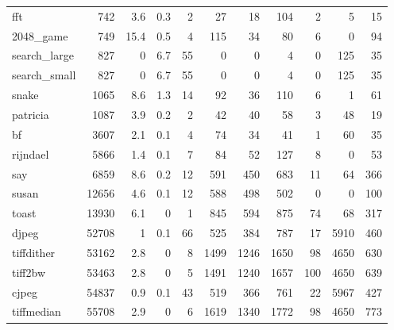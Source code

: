 \begin{tabular}{lrrrrrrrrrr}
 fft             &            742 &      3.6 &    0.3 &    2 &     27 &         18 &          104 &     2 &     5 &    15 \\
 2048\_game       &            749 &     15.4 &    0.5 &    4 &    115 &         34 &           80 &     6 &     0 &    94 \\
 search\_large    &            827 &      0   &    6.7 &   55 &      0 &          0 &            4 &     0 &   125 &    35 \\
 search\_small    &            827 &      0   &    6.7 &   55 &      0 &          0 &            4 &     0 &   125 &    35 \\
 snake           &           1065 &      8.6 &    1.3 &   14 &     92 &         36 &          110 &     6 &     1 &    61 \\
 patricia        &           1087 &      3.9 &    0.2 &    2 &     42 &         40 &           58 &     3 &    48 &    19 \\
 bf              &           3607 &      2.1 &    0.1 &    4 &     74 &         34 &           41 &     1 &    60 &    35 \\
 rijndael        &           5866 &      1.4 &    0.1 &    7 &     84 &         52 &          127 &     8 &     0 &    53 \\
 say             &           6859 &      8.6 &    0.2 &   12 &    591 &        450 &          683 &    11 &    64 &   366 \\
 susan           &          12656 &      4.6 &    0.1 &   12 &    588 &        498 &          502 &     0 &     0 &   100 \\
 toast           &          13930 &      6.1 &    0   &    1 &    845 &        594 &          875 &    74 &    68 &   317 \\
 djpeg           &          52708 &      1   &    0.1 &   66 &    525 &        384 &          787 &    17 &  5910 &   460 \\
 tiffdither      &          53162 &      2.8 &    0   &    8 &   1499 &       1246 &         1650 &    98 &  4650 &   630 \\
 tiff2bw         &          53463 &      2.8 &    0   &    5 &   1491 &       1240 &         1657 &   100 &  4650 &   639 \\
 cjpeg           &          54837 &      0.9 &    0.1 &   43 &    519 &        366 &          761 &    22 &  5967 &   427 \\
 tiffmedian      &          55708 &      2.9 &    0   &    6 &   1619 &       1340 &         1772 &    98 &  4650 &   773 \\

\end{tabular}
